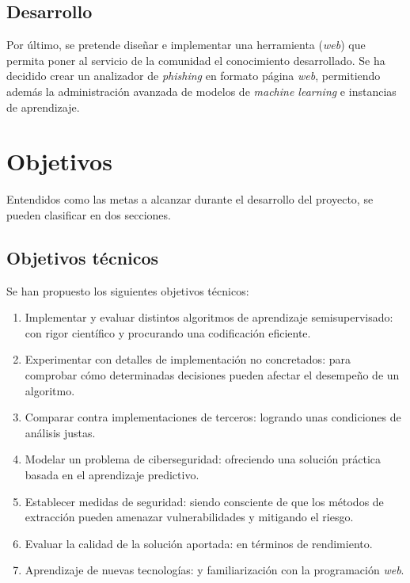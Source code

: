 \subsection{Desarrollo}

Por último, se pretende diseñar e implementar una herramienta (\textit{web}) que permita poner al servicio de la comunidad el conocimiento desarrollado. Se ha decidido crear un analizador de \textit{phishing} en formato página \textit{web}, permitiendo además la administración avanzada de modelos de \textit{machine learning} e instancias de aprendizaje.

\section{Objetivos}

Entendidos como las metas a alcanzar durante el desarrollo del proyecto, se pueden clasificar en dos secciones.

\subsection{Objetivos técnicos}
\label{Objetivos técnicos}

Se han propuesto los siguientes objetivos técnicos:

\begin{enumerate}
	\item Implementar y evaluar distintos algoritmos de aprendizaje semisupervisado: con rigor científico y procurando una codificación eficiente.
	\item Experimentar con detalles de implementación no concretados: para comprobar cómo determinadas decisiones pueden afectar el desempeño de un algoritmo.
	\item Comparar contra implementaciones de terceros: logrando unas condiciones de análisis justas.
	\item Modelar un problema de ciberseguridad: ofreciendo una solución práctica basada en el aprendizaje predictivo.
	\item Establecer medidas de seguridad: siendo consciente de que los métodos de extracción pueden amenazar vulnerabilidades y mitigando el riesgo.
	\item Evaluar la calidad de la solución aportada: en términos de rendimiento.
	\item Aprendizaje de nuevas tecnologías: y familiarización con la programación \textit{web}.
	
\end{enumerate}

